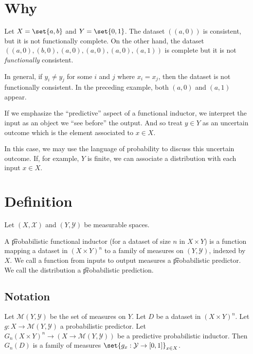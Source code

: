 

\section*{Why}

Let $X = \set{a, b}$ and $Y = \set{0, 1}$.
The dataset $((a, 0))$ is consistent, but it is not functionally complete.
On the other hand, the dataset $((a,0), (b,0), (a,0), (a,0), (a,0), (a, 1))$
is complete but it is not \textit{functionally} consistent.

In general, if $y_i \neq y_j$ for some $i$ and $j$ where $x_i = x_j$, then the dataset is not functionally consistent.
In the preceding example, both $(a, 0)$ and $(a, 1)$ appear.

If we emphasize the ``predictive'' aspect of a functional inductor, we interpret the input as an object we ``see before'' the output.
And so treat $y \in Y$ as an uncertain outcome which is the element associated to $x \in X$.

In this case, we may use the language of probability to discuss this uncertain outcome.
If, for example, $Y$ is finite, we can associate a distribution with each input $x \in X$.

\section*{Definition}

Let $(X, \mathcal{X} )$ and $(Y, \mathcal{Y} )$ be measurable spaces.

A \t{probabilistic functional inductor} (for a dataset of size $n$ in $X \times Y$) is a function mapping a dataset in $(X \times Y)^n$ to a family of measures on $(Y, \mathcal{Y} )$, indexed by $X$.
We call a function from inputs to output measures a \t{probabilistic predictor}.
We call the distribution a \t{probabilistic prediction}.

\subsection*{Notation}

Let $\mathcal{M} (Y, \mathcal{Y} )$ be the set of measures on $Y$.
Let $D$ be a dataset in $(X \times  Y)^n$.
Let $g: X \to \mathcal{M} (Y, \mathcal{Y} )$ a probabilistic predictor.
Let $G_n (X \times Y)^n \to (X \to \mathcal{M} (Y, \mathcal{Y} ))$ be a predictive probabilistic inductor.
Then $G_n(D)$ is a family of measures $\set{g_x: \mathcal{Y} \to [0, 1]}_{x \in X}$.

\blankpage
